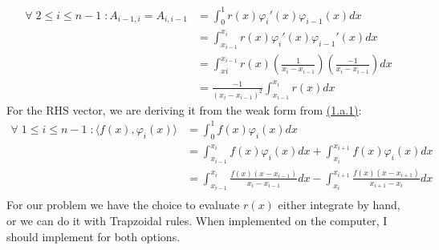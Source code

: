 \documentclass[]{article}
\begin{document}
        \begin{align*}\tag{1.a.6}\label{eqn:1.a.6}
            \forall\; 2 \le i \le n - 1 \; :
            A_{i - 1, i} = A_{i, i - 1} 
            &= 
            \int_{0}^{1} 
                r(x)\varphi_i'(x)\varphi_{i- 1}(x)
            dx
            \\
            &= 
                \int_{x_{i - 1 }}^{x_i} 
                    r(x)\varphi_i'(x)\varphi_{i - 1}'(x)
                dx
            \\
            &= 
            \int_{x{i}}^{x_{i - 1}} 
                r(x)
                \left(
                    \frac{1}{x_i - x_{i - 1}}
                \right)
                \left(
                    \frac{-1}{x_i - x_{i - 1}}
                \right)
            dx
            \\
            &= 
            \frac{-1}{(x_i - x_{i - 1})^2}
            \int_{x_{i - 1}}^{x_i} 
                r(x)
            dx
        \end{align*}
        For the RHS vector, we are deriving it from the weak form from \hyperref[eqn:1.a.1]{(1.a.1)}: 
        \begin{align*}\tag{1.a.7}\label{eqn:1.a.7}
            \forall\; 1 \le i \le n - 1\;: 
            \langle f(x), \varphi_i(x)\rangle
            &= 
            \int_{0}^{1} 
                f(x)\varphi_i(x)
            dx
            \\
            &= \int_{x_{i - 1}}^{x_i} 
                f(x)\varphi_i(x)
            dx + 
            \int_{x_i}^{x_{i + 1}} 
                f(x)\varphi_i(x)
            dx
            \\
            &= 
            \int_{x_{i - 1}}^{x_i} 
                \frac{f(x)(x - x_{i - 1})}{x_i - x_{i - 1}}
            dx - 
            \int_{x_i}^{x_{i + 1}}
                \frac{f(x)(x - x_{i + 1})}{x_{i + 1} - x_i}
            dx
            \\
        \end{align*}
        For our problem we have the choice to evaluate $r(x)$ either integrate by hand, or we can do it with Trapzoidal rules. When implemented on the computer, I should implement for both options. 
\end{document}

